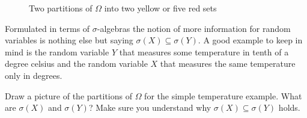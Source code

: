 \begin{figure}[h]
\begin{center}
  \vspace{-3mm}
  \caption*{Two partitions of $\Omega$ into two yellow or five red sets}
 \end{center}
\end{figure}
	 Formulated in terms of $\sigma$-algebras the notion of more information for random variables is nothing else but saying $\sigma(X)\subseteq \sigma(Y)$. A good example to keep in mind is the random variable $Y$ that measures some temperature in tenth of a degree celsius and the random variable $X$ that measures the same temperature only in degrees.
	 \begin{luebung}
	 	Draw a picture of the partitions of $\Omega$ for the simple temperature example. What are $\sigma(X)$ and $\sigma(Y)$? Make sure you understand why $\sigma(X)\subseteq \sigma(Y)$ holds.
	 \end{luebung}	
	 
